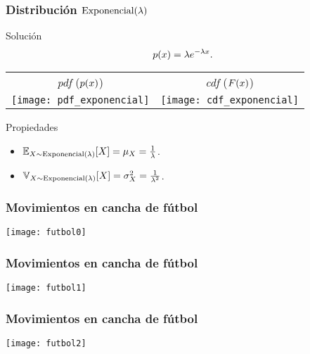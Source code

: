 \documentclass[table]{beamer}
\begin{document}
\begin{frame}
    \frametitle{Distribución $\exponential{\lambda}$}
    \begin{block}{Solución}
        \begin{equation*}
            \pdf{x} = \lambda e^{- \lambda x} .
        \end{equation*}
    \end{block}
    \begin{center}
        \begin{tabular}{cc}
            \emph{pdf} ($\pdf{x}$) & \emph{cdf} ($\FF{x}$) \\
            \texttt{[image: pdf\_exponencial]} &
            \texttt{[image: cdf\_exponencial]}
        \end{tabular}
    \end{center}
    \begin{block}{Propiedades}
        \begin{itemize}
            \item $\expecteddist{X \sim \exponential{\lambda}}{X} = \mu_{X} = \frac{1}{\lambda}$.
            \item $\variancedist{X \sim \exponential{\lambda}}{X} = \sigma^{2}_{X} = \frac{1}{\lambda^{2}}$.
        \end{itemize}
    \end{block}
\end{frame}

\iffalse
\begin{frame}
    \frametitle{Movimientos en cancha de fútbol}
    \begin{center}
        \texttt{[image: futbol0]}
    \end{center}
\end{frame}

\begin{frame}
    \frametitle{Movimientos en cancha de fútbol}
    \begin{center}
        \texttt{[image: futbol1]}
    \end{center}
\end{frame}

\begin{frame}
    \frametitle{Movimientos en cancha de fútbol}
    \begin{center}
        \texttt{[image: futbol2]}
    \end{center}
\end{frame}
\end{document}
